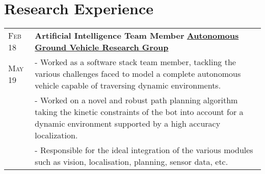 \vspace{0.2cm}
\section{\textcolor{primary}{Research Experience}}
\begin{tabularx}{\linewidth}{ l | X }
\textsc{Feb 18} & \textbf{Artificial Intelligence Team Member} \hfill\href{http://www.agv.iitkgp.ac.in/}{\textbf{Autonomous Ground Vehicle Research Group}}\\
\textsc{May 19} & {- Worked as a software stack team member, tackling the various challenges faced to model a complete autonomous vehicle capable of traversing dynamic environments.}\\
& {- Worked on a novel and robust path planning algorithm taking the kinetic constraints of the bot into account for a dynamic environment supported by a high accuracy localization.}\\
& {- Responsible for the ideal integration of the various modules such as vision, localisation, planning, sensor data, etc.}
\end{tabularx}


\vspace{0.2cm}
